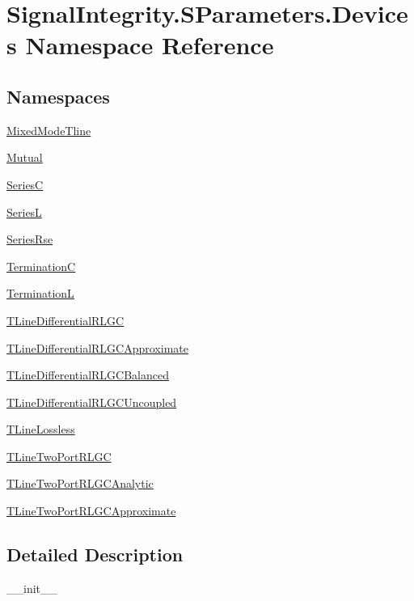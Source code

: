 \hypertarget{namespaceSignalIntegrity_1_1SParameters_1_1Devices}{}\section{Signal\+Integrity.\+S\+Parameters.\+Devices Namespace Reference}
\label{namespaceSignalIntegrity_1_1SParameters_1_1Devices}
\subsection*{Namespaces}
\begin{DoxyCompactItemize}
\item 
 \hyperlink{namespaceSignalIntegrity_1_1SParameters_1_1Devices_1_1MixedModeTline}{Mixed\+Mode\+Tline}
\item 
 \hyperlink{namespaceSignalIntegrity_1_1SParameters_1_1Devices_1_1Mutual}{Mutual}
\item 
 \hyperlink{namespaceSignalIntegrity_1_1SParameters_1_1Devices_1_1SeriesC}{SeriesC}
\item 
 \hyperlink{namespaceSignalIntegrity_1_1SParameters_1_1Devices_1_1SeriesL}{SeriesL}
\item 
 \hyperlink{namespaceSignalIntegrity_1_1SParameters_1_1Devices_1_1SeriesRse}{Series\+Rse}
\item 
 \hyperlink{namespaceSignalIntegrity_1_1SParameters_1_1Devices_1_1TerminationC}{TerminationC}
\item 
 \hyperlink{namespaceSignalIntegrity_1_1SParameters_1_1Devices_1_1TerminationL}{TerminationL}
\item 
 \hyperlink{namespaceSignalIntegrity_1_1SParameters_1_1Devices_1_1TLineDifferentialRLGC}{T\+Line\+Differential\+R\+L\+GC}
\item 
 \hyperlink{namespaceSignalIntegrity_1_1SParameters_1_1Devices_1_1TLineDifferentialRLGCApproximate}{T\+Line\+Differential\+R\+L\+G\+C\+Approximate}
\item 
 \hyperlink{namespaceSignalIntegrity_1_1SParameters_1_1Devices_1_1TLineDifferentialRLGCBalanced}{T\+Line\+Differential\+R\+L\+G\+C\+Balanced}
\item 
 \hyperlink{namespaceSignalIntegrity_1_1SParameters_1_1Devices_1_1TLineDifferentialRLGCUncoupled}{T\+Line\+Differential\+R\+L\+G\+C\+Uncoupled}
\item 
 \hyperlink{namespaceSignalIntegrity_1_1SParameters_1_1Devices_1_1TLineLossless}{T\+Line\+Lossless}
\item 
 \hyperlink{namespaceSignalIntegrity_1_1SParameters_1_1Devices_1_1TLineTwoPortRLGC}{T\+Line\+Two\+Port\+R\+L\+GC}
\item 
 \hyperlink{namespaceSignalIntegrity_1_1SParameters_1_1Devices_1_1TLineTwoPortRLGCAnalytic}{T\+Line\+Two\+Port\+R\+L\+G\+C\+Analytic}
\item 
 \hyperlink{namespaceSignalIntegrity_1_1SParameters_1_1Devices_1_1TLineTwoPortRLGCApproximate}{T\+Line\+Two\+Port\+R\+L\+G\+C\+Approximate}
\end{DoxyCompactItemize}


\subsection{Detailed Description}
\begin{DoxyVerb}__init__\end{DoxyVerb}
 